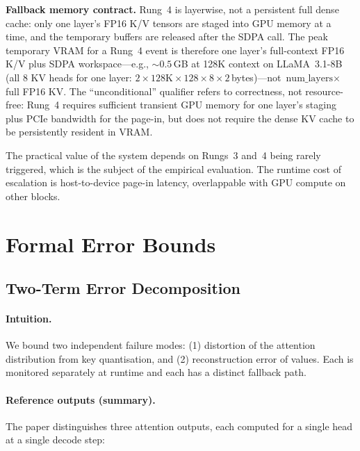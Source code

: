 \documentclass[10pt,twocolumn,a4paper]{article}
\theoremstyle{definition}
\theoremstyle{remark}
\begin{document}
\textbf{Fallback memory contract.}  Rung~4 is layerwise, not a persistent full dense cache: only one layer's FP16 K/V tensors are staged into GPU memory at a time, and the temporary buffers are released after the SDPA call.  The peak temporary VRAM for a Rung~4 event is therefore one layer's full-context FP16 K/V plus SDPA workspace---e.g., ${\sim}0.5$\,GB at 128K context on LLaMA~3.1-8B (all 8 KV heads for one layer: $2 \times 128\text{K} \times 128 \times 8 \times 2$\,bytes)---not $\text{num\_layers} \times$ full FP16 KV\@.  The ``unconditional'' qualifier refers to correctness, not resource-free: Rung~4 requires sufficient transient GPU memory for one layer's staging plus PCIe bandwidth for the page-in, but does not require the dense KV cache to be persistently resident in VRAM\@.

The practical value of the system depends on Rungs~3 and~4 being rarely triggered, which is the subject of the empirical evaluation.  The runtime cost of escalation is host-to-device page-in latency, overlappable with GPU compute on other blocks.


\section{Formal Error Bounds}
\label{sec:bounds}

\subsection{Two-Term Error Decomposition}
\label{sec:decomposition}

\paragraph{Intuition.}
We bound two independent failure modes: (1) distortion of the attention distribution from key quantisation, and (2) reconstruction error of values.  Each is monitored separately at runtime and each has a distinct fallback path.

\paragraph{Reference outputs (summary).}
The paper distinguishes three attention outputs, each computed for a single head at a single decode step:
\end{document}
